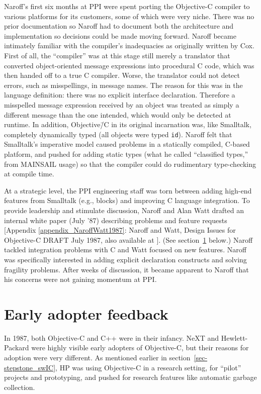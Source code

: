 \documentclass[acmsmall,screen]{acmart}
\begin{document}
Naroff's first six months at PPI were spent porting the Objective-C compiler to various platforms for its customers, some of which were very niche. There was no prior documentation so Naroff had to document both the architecture and implementation so decisions could be made moving forward. Naroff became intimately familiar with the compiler's inadequacies as originally written by Cox. First of all, the ``compiler'' was at this stage still merely a translator that converted object-oriented message expressions into procedural C code, which was then handed off to a true C compiler. Worse, the translator could not detect errors, such as misspellings, in message names. The reason for this was in the language definition: there was no explicit interface declaration. Therefore a misspelled message expression received by an object was treated as simply a different message than the one intended, which would only be detected at runtime. In addition, Objective\=/C in its original incarnation was, like Smalltalk, completely dynamically typed (all objects were typed \verb$id$). Naroff felt that Smalltalk's imperative model caused problems in a statically compiled, C-based platform, and pushed for adding static types (what he called ``classified types,'' from MAINSAIL usage) so that the compiler could do rudimentary type-checking at compile time.

At a strategic level, the PPI engineering staff was torn between adding high-end features from Smalltalk (e.g., blocks) and improving C language integration. To provide leadership and stimulate discussion, Naroff and Alan Watt drafted an internal white paper (July '87) describing problems and feature requests [Appendix \ref{appendix_NaroffWatt1987}: Naroff and Watt, Design Issues for Objective-C DRAFT July 1987, also available at \citealp{naroff_design_1987}]. (See section~\ref{sec-earlyadopterfeedback} below.) Naroff tackled integration problems with C and Watt focused on new features. Naroff was specifically interested in adding explicit declaration constructs and solving fragility problems. After weeks of discussion, it became apparent to Naroff that his concerns were not gaining momentum at PPI. 
\section{Early adopter feedback}
\label{sec-earlyadopterfeedback}
In 1987, both Objective-C and C++ were in their infancy. NeXT and Hewlett-Packard were highly visible early adopters of Objective-C, but their reasons for adoption were very different. As mentioned earlier in section~\ref{sec-stepstone_swIC}, HP was using Objective-C in a research setting, for ``pilot'' projects and prototyping, and pushed for research features like automatic garbage collection.
\end{document}
